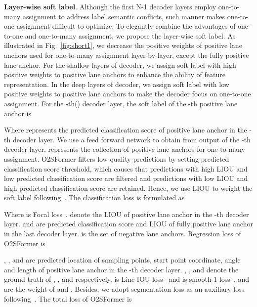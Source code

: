 \documentclass{bmvc2k}
\begin{document}
{\bf Layer-wise soft label}. Although the first N-1 decoder layers employ one-to-many assignment to 
address label semantic conflicts, such manner makes one-to-one assignment difficult to optimize. 
To elegantly combine the advantages of one-to-one and one-to-many assignment, we propose the 
layer-wise soft label. As illustrated in Fig.~\ref{fig:short1}, we decrease the positive weights of positive lane anchors used for one-to-many assignment
layer-by-layer, except the fully positive lane anchor. For the shallow layers of decoder, 
we assign soft label with high positive weights to positive lane anchors to enhance 
the ability of feature representation. In the deep layers of decoder, we assign soft label with low 
positive weights to positive lane anchors to make the decoder focus on one-to-one assignment. For the -th() decoder layer, the soft label of the -th positive lane anchor is
\vspace{-0.23cm}

\vspace{0.05cm}

Where  represents the predicted classification score of positive lane anchor  in the -th decoder layer. We use a feed forward network to obtain  from output of the -th decoder layer.
 represents the collection of positive lane anchors for one-to-many assignment.
O2SFormer filters low quality predictions by setting predicted classification score threshold, which causes that predictions with 
high LIOU and low predicted classification score are filtered and predictions with low LIOU 
and high predicted classification score are retained. Hence, we use LIOU to weight the soft label following~\cite{zhang2021varifocalnet}. 
The classification loss is formulated as
\vspace{-0.15cm}
 
 \vspace{-0.5cm}
 
 Where  is Focal loss~\cite{lin2017focal}.  denote the LIOU of positive lane anchor  in the -th decoder layer.  
  and  are predicted classification score and LIOU of fully positive lane anchor in the last decoder layer.  is the set of negative lane anchors. Regression loss of O2SFormer is
 \vspace{-0.15cm}
 
 \vspace{-0.2cm}
 
 , ,  and  are predicted location of  sampling points, start point coordinate, 
 angle and length of positive lane anchor  in the -th decoder layer. , ,  and  denote the ground truth of , ,  and  respectively. 
  is Line-IOU loss~\cite{zheng2022clrnet} and  is smooth-1 loss~\cite{girshick2015fast}.  and  are the weight of  and .
 Besides, we adopt segmentation loss as an auxiliary loss following~\cite{zheng2022clrnet}. The total loss of O2SFormer is
 \vspace{-0.2cm}
 
\end{document}
